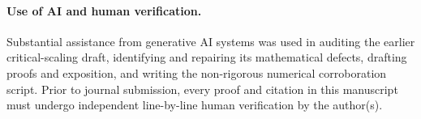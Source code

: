 \documentclass[11pt]{article}
\theoremstyle{definition}
\theoremstyle{remark}
\begin{document}
\paragraph{Use of AI and human verification.}
Substantial assistance from generative AI systems was used in auditing the
earlier critical-scaling draft, identifying and repairing its mathematical
defects, drafting proofs and exposition, and writing the non-rigorous
numerical corroboration script.
Prior to journal submission, every proof and citation in this manuscript must
undergo independent line-by-line human verification by the author(s).
\end{document}
